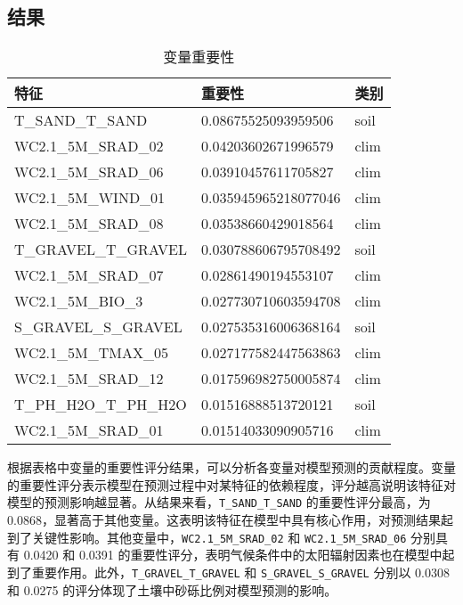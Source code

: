 \documentclass[AutoFakeBold]{LZUThesis-PgD&PhD}
\begin{document}
        \subsection{结果}
	\begin{table}[H]
		\centering
		\begin{tabular}{|l|l|l|}
			\hline
			\textbf{特征}                         & \textbf{重要性}    & \textbf{类别} \\ \hline
			T\_SAND\_T\_SAND                       & 0.08675525093959506 & soil          \\ \hline
			WC2.1\_5M\_SRAD\_02                    & 0.04203602671996579 & clim          \\ \hline
			WC2.1\_5M\_SRAD\_06                    & 0.03910457611705827 & clim          \\ \hline
			WC2.1\_5M\_WIND\_01                    & 0.035945965218077046 & clim         \\ \hline
			WC2.1\_5M\_SRAD\_08                    & 0.03538660429018564 & clim          \\ \hline
			T\_GRAVEL\_T\_GRAVEL                   & 0.030788606795708492 & soil         \\ \hline
			WC2.1\_5M\_SRAD\_07                    & 0.02861490194553107 & clim          \\ \hline
			WC2.1\_5M\_BIO\_3                       & 0.027730710603594708 & clim         \\ \hline
			S\_GRAVEL\_S\_GRAVEL                   & 0.027535316006368164 & soil          \\ \hline
			WC2.1\_5M\_TMAX\_05                    & 0.027177582447563863 & clim         \\ \hline
			WC2.1\_5M\_SRAD\_12                    & 0.017596982750005874 & clim         \\ \hline
			T\_PH\_H2O\_T\_PH\_H2O                 & 0.01516888513720121  & soil         \\ \hline
			WC2.1\_5M\_SRAD\_01                    & 0.01514033090905716 & clim          \\ \hline
		\end{tabular}
		\caption{变量重要性}
		\label{tab:variable_importance}
	\end{table}
	
根据表格中变量的重要性评分结果，可以分析各变量对模型预测的贡献程度。变量的重要性评分表示模型在预测过程中对某特征的依赖程度，评分越高说明该特征对模型的预测影响越显著。从结果来看，\texttt{T\_SAND\_T\_SAND} 的重要性评分最高，为 0.0868，显著高于其他变量。这表明该特征在模型中具有核心作用，对预测结果起到了关键性影响。其他变量中，\texttt{WC2.1\_5M\_SRAD\_02} 和 \texttt{WC2.1\_5M\_SRAD\_06} 分别具有 0.0420 和 0.0391 的重要性评分，表明气候条件中的太阳辐射因素也在模型中起到了重要作用。此外，\texttt{T\_GRAVEL\_T\_GRAVEL} 和 \texttt{S\_GRAVEL\_S\_GRAVEL} 分别以 0.0308 和 0.0275 的评分体现了土壤中砂砾比例对模型预测的影响。
\end{document}
